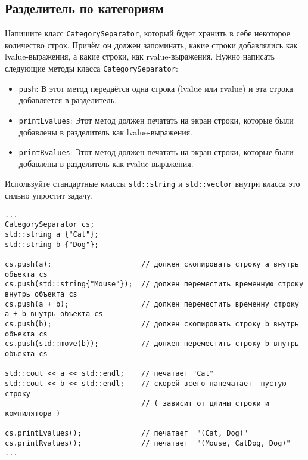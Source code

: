 \documentclass{article}
\begin{document}
\newpage
\subsection{Разделитель по категориям}
Напишите класс \texttt{CategorySeparator}, который будет хранить в себе некоторое количество строк.
Причём он должен запоминать, какие строки добавлялись как lvalue-выражения, а какие строки, как rvalue-выражения. Нужно написать следующие методы класса \texttt{CategorySeparator}:

\begin{itemize}
\item \texttt{push}: В этот метод передаётся одна строка (lvalue или rvalue) и эта строка добавляется в разделитель.
\item \texttt{printLvalues}: Этот метод должен печатать на экран строки, которые были добавлены в разделитель как lvalue-выражения.
\item \texttt{printRvalues}: Этот метод должен печатать на экран строки, которые были добавлены в разделитель как rvalue-выражения.
\end{itemize}

Используйте стандартные классы \texttt{std::string} и \texttt{std::vector} внутри класса это сильно упростит задачу.
\begin{lstlisting}
...
CategorySeparator cs;
std::string a {"Cat"};
std::string b {"Dog"};

cs.push(a);                     // должен скопировать строку a внутрь объекта cs
cs.push(std::string{"Mouse"});  // должен переместить временную строку внутрь объекта cs
cs.push(a + b);                 // должен переместить временну строку a + b внутрь объекта cs
cs.push(b);                     // должен скопировать строку b внутрь объекта cs
cs.push(std::move(b)); 	        // должен переместить строку b внутрь объекта cs

std::cout << a << std::endl;    // печатает "Cat"
std::cout << b << std::endl;    // скорей всего напечатает  пустую строку 
                                // ( зависит от длины строки и компилятора )

cs.printLvalues();              // печатает  "(Cat, Dog)"
cs.printRvalues();              // печатает  "(Mouse, CatDog, Dog)"
...
\end{lstlisting}
\end{document}
